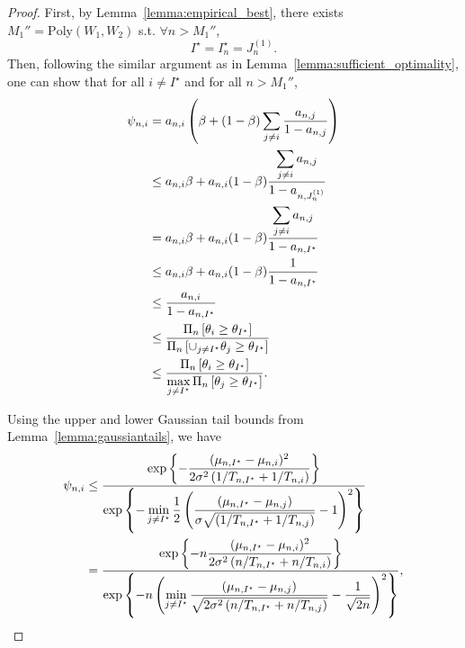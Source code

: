\begin{proof}
First, by Lemma~\ref{lemma:empirical_best}, there exists $M_1'' = \text{Poly}(W_1,W_2)$ s.t. $\forall n > M_1''$, 
\[
    I^\star = I_n^\star = J_n^{(1)}.
\]
Then, following the similar argument as in Lemma~\ref{lemma:sufficient_optimality}, one can show that for all $i\neq I^\star$ and for all $n > M_1''$,
\begin{align*}
	\psi_{n,i} &=a_{n,i} \left( \beta  + (1-\beta) \sum_{j \neq i} \frac{a_{n,j}}{1-a_{n,j}} \right)\\
	           &\leq a_{n,i} \beta  + a_{n,i} (1-\beta) \frac{\displaystyle \sum_{j \neq i} a_{n,j}}{\displaystyle 1-a_{n,J_n^{(1)}}}\\
	           &= a_{n,i} \beta  + a_{n,i} (1-\beta) \frac{\displaystyle \sum_{j \neq i} a_{n,j}}{\displaystyle 1-a_{n,I^\star}}\\
	           &\leq a_{n,i}\beta  + a_{n,i} (1-\beta) \frac{1}{1-a_{n,I^\star}}\\
	           &\leq \frac{a_{n,i}}{1-a_{n,I^\star}}\\
	           &\leq \frac{\displaystyle \Pi_{n}\left[ \theta_i\geq\theta_{I^\star} \right]}{\displaystyle \Pi_{n}\left[ \cup_{j\neq I^\star}\theta_j\geq\theta_{I^\star} \right]}\\
	           &\leq \frac{\displaystyle \Pi_{n}\left[ \theta_i\geq\theta_{I^\star} \right]}{\displaystyle \max_{j\neq I^\star} \Pi_{n}\left[ \theta_j\geq\theta_{I^\star} \right]}.
\end{align*}

Using the upper and lower Gaussian tail bounds from Lemma~\ref{lemma:gaussiantails}, we have
\begin{align*}
    \psi_{n,i} &\leq \frac{\displaystyle \exp\left\{- \frac{(\mu_{n,I^\star} - \mu_{n,i})^2}{2\sigma^2\left(1/T_{n,I^\star} + 1/T_{n,i}\right)}\right\}}{\displaystyle \exp\left\{- \min_{j\neq I^\star} \frac{1}{2}\left(\frac{(\mu_{n,I^\star} - \mu_{n,j})}{\sigma\sqrt{\left(1/T_{n,I^\star} + 1/T_{n,j}\right)}} -1\right)^2\right\}}\\ 
               &=  \frac{\displaystyle \exp\left\{- n\frac{(\mu_{n,I^\star} - \mu_{n,i})^2}{2\sigma^2\left(n/T_{n,I^\star} + n/T_{n,i}\right)}\right\}}{\displaystyle \exp\left\{- {n}\left(\min_{j\neq I^\star} \frac{(\mu_{n,I^\star} - \mu_{n,j})}{\sqrt{2\sigma^2\left(n/T_{n,I^\star} + n/T_{n,j}\right)}} -\frac{1}{\sqrt{2n}}\right)^2\right\}},
\end{align*}


\end{proof}

